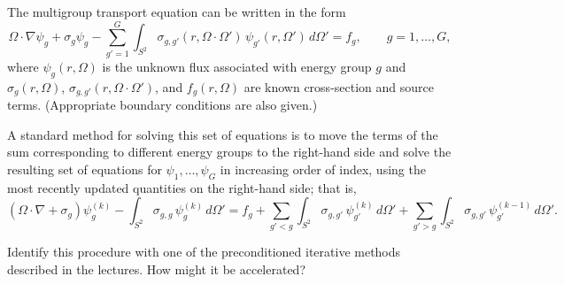 \documentclass{ctexart}
\begin{document}
\begin{problem}\label{pro:9}
  The multigroup transport equation can be written in the form
  \[
    \Omega \cdot \nabla \psi_g
    +\sigma_g \psi_g
    -\sum_{g'=1}^{G}
    \int_{S^2}
    \sigma_{g,g'}(r,\Omega\cdot\Omega')
    \,\psi_{g'}(r,\Omega')
    \,d\Omega'
    =
    f_g,
    \qquad
    g=1,\ldots,G,
  \]
  where $\psi_g(r,\Omega)$ is the unknown flux associated with energy group $g$ and
  $\sigma_g(r,\Omega)$, $\sigma_{g,g'}(r,\Omega\cdot\Omega')$, and
  $f_g(r,\Omega)$ are known cross-section and source terms.
  (Appropriate boundary conditions are also given.)

  A standard method for solving this set of equations is to move the terms
  of the sum corresponding to different energy groups to the right-hand side
  and solve the resulting set of equations for
  $\psi_1,\ldots,\psi_G$ in increasing order of index, using the most
  recently updated quantities on the right-hand side; that is,
  \[
    (\Omega\cdot\nabla+\sigma_g)\psi_g^{(k)}
    -
    \int_{S^2}
    \sigma_{g,g}\,\psi_g^{(k)}
    \,d\Omega'
    =
    f_g
    +
    \sum_{g'<g}
    \int_{S^2}
    \sigma_{g,g'}\,\psi_{g'}^{(k)}
    \,d\Omega'
    +
    \sum_{g'>g}
    \int_{S^2}
    \sigma_{g,g'}\,\psi_{g'}^{(k-1)}
    \,d\Omega'.
  \]

  Identify this procedure with one of the preconditioned iterative methods
  described in the lectures. How might it be accelerated?
\end{problem}
\end{document}
